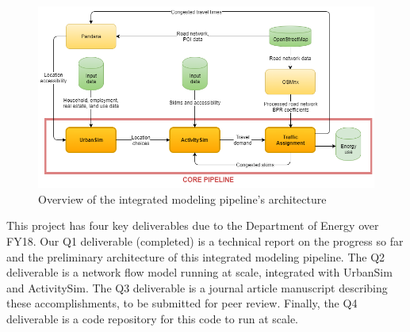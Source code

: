 \documentclass[12pt]{article}
\begin{document}
\begin{figure}[htbp]
	\center
	\includegraphics[width=\textwidth]{diagram_pipeline.png}
	\caption{Overview of the integrated modeling pipeline's architecture}
	\label{fig:overview_pipeline_architecture}
\end{figure}

This project has four key deliverables due to the Department of Energy over FY18. Our Q1 deliverable (completed) is a technical report on the progress so far and the preliminary architecture of this integrated modeling pipeline. The Q2 deliverable is a network flow model running at scale, integrated with UrbanSim and ActivitySim. The Q3 deliverable is a journal article manuscript describing these accomplishments, to be submitted for peer review. Finally, the Q4 deliverable is a code repository for this code to run at scale.
\end{document}
